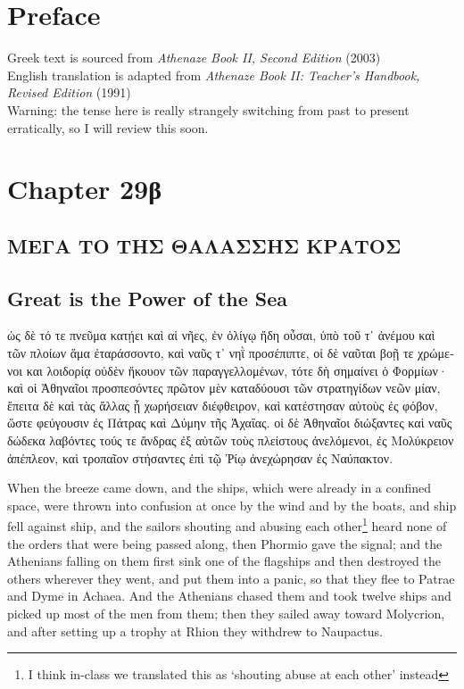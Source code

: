 \documentclass{article}
\begin{document}
\section{Preface}

Greek text is sourced from \emph{Athenaze Book II, Second Edition} (2003) \\
English translation is adapted from \emph{Athenaze Book II: Teacher's Handbook, Revised Edition} (1991) \\

Warning: the tense here is really strangely switching from past to present erratically,
so I will review this soon.

\section{Chapter 29\textgreek{β}}

\subsection*{\textgreek{ΜΕΓΑ ΤΟ ΤΗΣ ΘΑΛΑΣΣΗΣ ΚΡΑΤΟΣ}}
\subsection*{Great is the Power of the Sea}

\begin{greek}
ὡς δὲ τό τε πνεῦμα κατῄει καὶ αἱ νῆες, ἐν ὀλίγῳ ἤδη οὖσαι,
ὑπὸ τοῦ τ᾿ ἀνέμου καὶ τῶν πλοίων ἅμα ἐταράσσοντο, καὶ ναῦς τ᾿ νηῒ προσέπιπτε,
οἱ δὲ ναῦται βοῇ τε χρώμενοι και λοιδορίᾳ οὐδὲν ἤκουον τῶν παραγγελλομένων, τότε δὴ σημαίνει ὁ Φορμίων·
καὶ οἱ Ἀθηναῖοι προσπεσόντες πρῶτον μὲν καταδύουσι τῶν στρατηγίδων νεῶν μίαν, ἔπειτα δὲ καὶ τὰς ἄλλας ᾗ χωρήσειαν διέφθειρον,
καὶ κατέστησαν αὐτοὺς ἐς φόβον, ὥστε φεύγουσιν ἐς Πάτρας καὶ Δύμην τῆς Ἀχαΐας.
οἱ δὲ Ἀθηναῖοι διώξαντες καὶ ναῦς δώδεκα λαβόντες τούς τε ἄνδρας ἐξ αὐτῶν τοὺς πλείστους ἀνελόμενοι,
ἐς Μολύκρειον ἀπέπλεον, καὶ τροπαῖον στήσαντες ἐπὶ τῷ Ῥίῳ ἀνεχώρησαν ἐς Ναύπακτον. \\
\end{greek}


When the breeze came down, and the ships, which were already in a confined space, were thrown into confusion at once by the wind and by the boats,
and ship fell against ship, and the sailors shouting and abusing each other\footnote{I think in-class we translated this as `shouting abuse at each other' instead}
heard none of the orders that were being passed along,
then Phormio gave the signal; and the Athenians falling on them first sink one of the flagships and then destroyed the others wherever they went,
and put them into a panic, so that they flee to Patrae and Dyme in Achaea.
And the Athenians chased them and took twelve ships and picked up most of the men from them;
then they sailed away toward Molycrion,
and after setting up a trophy at Rhion they withdrew to Naupactus. \\
\end{document}
